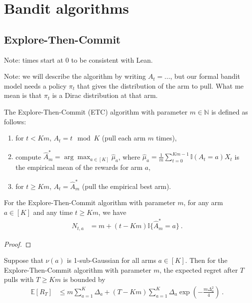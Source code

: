 \chapter{Bandit algorithms}

\section{Explore-Then-Commit}

Note: times start at 0 to be consistent with Lean.

Note: we will describe the algorithm by writing $A_t = ...$, but our formal bandit model needs a policy $\pi_t$ that gives the distribution of the arm to pull. What me mean is that $\pi_t$ is a Dirac distribution at that arm.

\begin{definition}\label{def:etcAlgorithm}
The Explore-Then-Commit (ETC) algorithm with parameter $m \in \mathbb{N}$ is defined as follows:
\begin{enumerate}
  \item for $t < Km$, $A_t = t \mod K$ (pull each arm $m$ times),
  \item compute $\hat{A}_m^* = \arg\max_{a \in [K]} \hat{\mu}_a$, where $\hat{\mu}_a = \frac{1}{m} \sum_{t=0}^{Km-1} \mathbb{I}(A_t = a) X_t$ is the empirical mean of the rewards for arm $a$,
  \item for $t \ge Km$, $A_t = \hat{A}_m^*$ (pull the empirical best arm).
\end{enumerate}
\end{definition}


\begin{lemma}\label{lem:pullCount_etcAlgorithm}
For the Explore-Then-Commit algorithm with parameter $m$, for any arm $a \in [K]$ and any time $t \ge Km$, we have
\begin{align*}
  N_{t,a}
  &= m + (t - Km) \mathbb{I}\{\hat{A}_m^* = a\}
  \: .
\end{align*}
\end{lemma}

\begin{proof}

\end{proof}


\begin{theorem}\label{thm:regret_etc_le}
Suppose that $\nu(a)$ is 1-sub-Gaussian for all arms $a \in [K]$.
Then for the Explore-Then-Commit algorithm with parameter $m$, the expected regret after $T$ pulls with $T \ge Km$ is bounded by
\begin{align*}
  \mathbb{E}[R_T]
  &\le m \sum_{a=1}^K \Delta_a + (T - Km) \sum_{a=1}^K \Delta_a \exp\left(- \frac{m \Delta_a^2}{4}\right)
  \: .
\end{align*}
\end{theorem}

